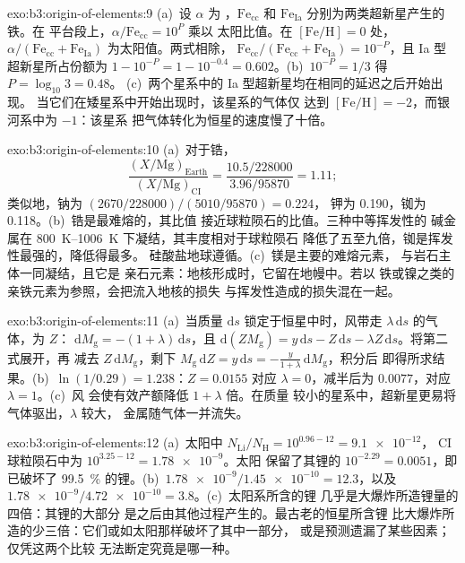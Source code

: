 \begin{solution}{exo:b3:origin-of-elements:9}
(a)~设 $\alpha$ 为 ，$\mathrm{Fe}_\mathrm{cc}$
和 $\mathrm{Fe}_\mathrm{Ia}$ 分别为两类超新星产生的铁。在
平台段上，$\alpha/\mathrm{Fe}_\mathrm{cc} = 10^{P}$ 乘以
太阳比值。在 $[\mathrm{Fe/H}] = 0$ 处，$\alpha/(\mathrm{Fe}_\mathrm{cc} +
\mathrm{Fe}_\mathrm{Ia})$ 为太阳值。两式相除，
$\mathrm{Fe}_\mathrm{cc}/(\mathrm{Fe}_\mathrm{cc} + \mathrm{Fe}_\mathrm{Ia})
= 10^{-P}$，且 Ia 型超新星所占份额为 $1 - 10^{-P} = 1 - 10^{-0.4} =
\num{0.602}$。(b)~$10^{-P} = 1/3$ 得 $P = \log_{10}3 = 0.48$。
(c)~两个星系中的 Ia 型超新星均在相同的延迟之后开始出现。
当它们在矮星系中开始出现时，该星系的气体仅
达到 $[\mathrm{Fe/H}] = -2$，而银河系中为 $-1$：该星系
把气体转化为恒星的速度慢了十倍。
\end{solution}

\begin{solution}{exo:b3:origin-of-elements:10}
(a)~对于锆，
\[
\frac{(X/\mathrm{Mg})_\mathrm{Earth}}{(X/\mathrm{Mg})_\mathrm{CI}} =
\frac{10.5/228000}{3.96/95870} = 1.11 ;
\]
类似地，钠为 $(2670/228000)/(5010/95870) = 0.224$，
钾为 \num{0.190}，铷为 \num{0.118}。(b)~锆是最难熔的，其比值
接近球粒陨石的比值。三种中等挥发性的
碱金属在 \qtyrange{800}{1006}{K} 下凝结，其丰度相对于球粒陨石
降低了五至九倍，铷是挥发性最强的，降低得最多。
硅酸盐地球遵循。(c)~镁是主要的难熔元素，
与岩石主体一同凝结，且它是
亲石元素：地核形成时，它留在地幔中。若以
铁或镍之类的亲铁元素为参照，会把流入地核的损失
与挥发性造成的损失混在一起。
\end{solution}

\begin{solution}{exo:b3:origin-of-elements:11}
(a)~当质量 $\mathrm{d}s$ 锁定于恒星中时，风带走
$\lambda\,\mathrm{d}s$ 的气体，为 $Z$：
$\mathrm{d}M_\mathrm{g} = -(1 + \lambda)\,\mathrm{d}s$，且
$\mathrm{d}(ZM_\mathrm{g}) = y\,\mathrm{d}s - Z\,\mathrm{d}s -
\lambda Z\,\mathrm{d}s$。将第二式展开，再
减去 $Z\,\mathrm{d}M_\mathrm{g}$，剩下 $M_\mathrm{g}\,\mathrm{d}Z =
y\,\mathrm{d}s = -\frac{y}{1 + \lambda}\,\mathrm{d}M_\mathrm{g}$，积分后
即得所求结果。(b)~$\ln(1/0.29) = 1.238$：$Z = 0.0155$ 对应
$\lambda = 0$，减半后为 $0.0077$，对应 $\lambda = 1$。(c)~风
会使有效产额降低 $1 + \lambda$ 倍。在质量
较小的星系中，超新星更易将气体驱出，$\lambda$ 较大，
金属随气体一并流失。
\end{solution}

\begin{solution}{exo:b3:origin-of-elements:12}
(a)~太阳中 $N_\mathrm{Li}/N_\mathrm{H} = 10^{0.96 - 12} = \num{9.1e-12}$，
CI 球粒陨石中为 $10^{3.25 - 12} = \num{1.78e-9}$。太阳
保留了其锂的 $10^{-2.29} = \num{0.0051}$，即已破坏了
\qty{99.5}{\percent} 的锂。(b)~$\num{1.78e-9}/\num{1.45e-10} = 12.3$，以及
$\num{1.78e-9}/\num{4.72e-10} = 3.8$。(c)~太阳系所含的锂
几乎是大爆炸所造锂量的四倍：其锂的大部分
是之后由其他过程产生的。最古老的恒星所含锂
比大爆炸所造的少三倍：它们或如太阳那样破坏了其中一部分，
或是预测遗漏了某些因素；仅凭这两个比较
无法断定究竟是哪一种。
\end{solution}

